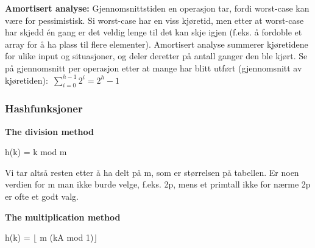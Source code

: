 \documentclass[12pt]{report}
\begin{document}
\begin{itemize}
\begin{itemize}

\par


\vspace{\baselineskip}

\vspace{\baselineskip}
\textbf{Amortisert analyse:} Gjennomsnittstiden en operasjon tar, fordi worst-case kan være for pessimistisk. Si worst-case har en viss kjøretid, men etter at worst-case har skjedd én gang er det veldig lenge til det kan skje igjen (f.eks. å fordoble et array for å ha plass til flere elementer). Amortisert analyse summerer kjøretidene for ulike input og situasjoner, og deler deretter på antall ganger den ble kjørt. Se på gjennomsnitt per operasjon etter at mange har blitt utført (gjennomsnitt av kjøretiden):\   \(  \sum _{i=0}^{h-1}2^{i}=2^{h}-1 \) \par


\vspace{\baselineskip}

\end{itemize}
\end{itemize}
\vspace{\baselineskip}\subsubsection*{Hashfunksjoner}

\vspace{\baselineskip}
\textbf{The division method}\par

\begin{Center}
h(k) = k mod m
\end{Center}\par

Vi tar altså resten etter å ha delt på m, som er størrelsen på tabellen. Er noen verdien for m man ikke burde velge, f.eks. 2p, mens et primtall ikke for nærme 2p er ofte et godt valg.\par


\vspace{\baselineskip}
\textbf{The multiplication method}\par

\begin{Center}
h(k) = $ \lfloor $ m (kA mod 1)$ \rfloor $ 
\end{Center}\par
\end{document}
